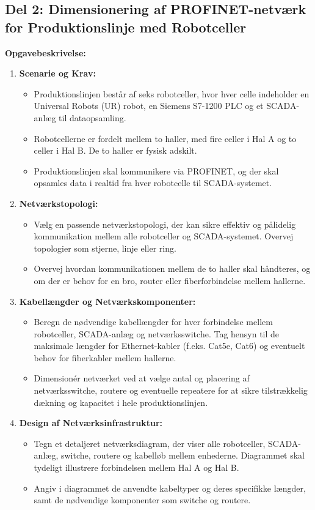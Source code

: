 \subsection{Del 2: Dimensionering af PROFINET-netværk for Produktionslinje med Robotceller}
\textbf{Opgavebeskrivelse:}
\begin{enumerate}
	\item \textbf{Scenarie og Krav:}
	\begin{itemize}
		\item Produktionslinjen består af seks robotceller, hvor hver celle indeholder en Universal Robots (UR) robot, en Siemens S7-1200 PLC og et SCADA-anlæg til dataopsamling.
		\item Robotcellerne er fordelt mellem to haller, med fire celler i Hal A og to celler i Hal B. De to haller er fysisk adskilt.
		\item Produktionslinjen skal kommunikere via PROFINET, og der skal opsamles data i realtid fra hver robotcelle til SCADA-systemet.
	\end{itemize}
	
	\item \textbf{Netværkstopologi:}
	\begin{itemize}
		\item Vælg en passende netværkstopologi, der kan sikre effektiv og pålidelig kommunikation mellem alle robotceller og SCADA-systemet. Overvej topologier som stjerne, linje eller ring.
		\item Overvej hvordan kommunikationen mellem de to haller skal håndteres, og om der er behov for en bro, router eller fiberforbindelse mellem hallerne.
	\end{itemize}
	
	\item \textbf{Kabellængder og Netværkskomponenter:}
	\begin{itemize}
		\item Beregn de nødvendige kabellængder for hver forbindelse mellem robotceller, SCADA-anlæg og netværksswitche. Tag hensyn til de maksimale længder for Ethernet-kabler (f.eks. Cat5e, Cat6) og eventuelt behov for fiberkabler mellem hallerne.
		\item Dimensionér netværket ved at vælge antal og placering af netværksswitche, routere og eventuelle repeatere for at sikre tilstrækkelig dækning og kapacitet i hele produktionslinjen.
	\end{itemize}
	
	\item \textbf{Design af Netværksinfrastruktur:}
	\begin{itemize}
		\item Tegn et detaljeret netværksdiagram, der viser alle robotceller, SCADA-anlæg, switche, routere og kabelløb mellem enhederne. Diagrammet skal tydeligt illustrere forbindelsen mellem Hal A og Hal B.
		\item Angiv i diagrammet de anvendte kabeltyper og deres specifikke længder, samt de nødvendige komponenter som switche og routere.
	\end{itemize}
	

\end{enumerate}
